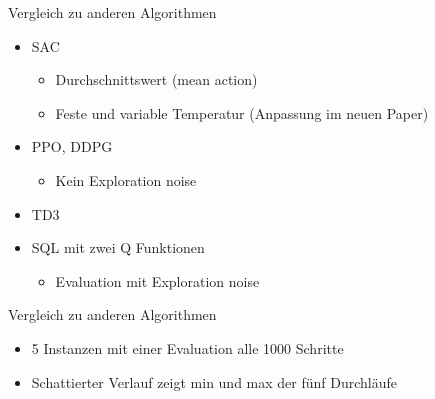 \begin{frame}{Vergleich zu anderen Algorithmen}
    \begin{itemize}
        \item SAC
        \begin{itemize}
            \item Durchschnittswert (mean action)
            \item Feste und variable Temperatur (Anpassung im neuen Paper)
        \end{itemize} 
        \item PPO, DDPG
        \begin{itemize}
            \item Kein Exploration noise
        \end{itemize}
        \item TD3
        \item SQL mit zwei Q Funktionen
        \begin{itemize}
            \item Evaluation mit Exploration noise        
        \end{itemize}
    \end{itemize}
\end{frame}

\begin{frame}{Vergleich zu anderen Algorithmen}
    \begin{itemize}     
        \item 5 Instanzen mit einer Evaluation alle 1000 Schritte
        \item Schattierter Verlauf zeigt min und max der fünf Durchläufe
    \end{itemize}
    
\end{frame}


